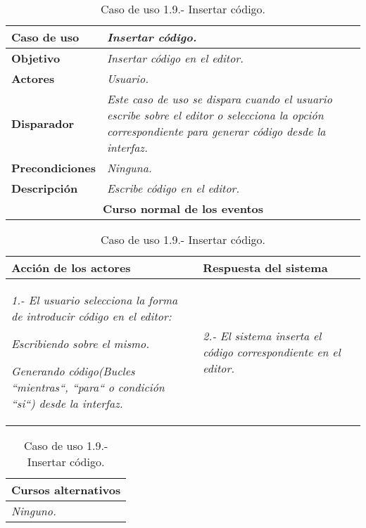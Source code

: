 \documentclass[twoside,a4paper,11pt]{book}
\begin{document}
\begin{table}[!ht]
    \centering
    \begin{tabular}{|p{4cm}|p{11.5cm}|}
    \hline

    \textbf{Caso de uso} & \textit{Insertar código.}\\
    \hline

    \textbf{Objetivo} & \textit{Insertar código en el editor.}\\
    \hline

    \textbf{Actores} & \textit{Usuario.}\\
    \hline

    \textbf{Disparador} & \textit{Este caso de uso se dispara cuando el usuario escribe sobre el editor o selecciona la opción correspondiente para
				  generar código desde la interfaz.}\\
    \hline

    \textbf{Precondiciones} & \textit{Ninguna.}\\
    \hline

    \textbf{Descripción} & \textit{Escribe código en el editor.}\\
    \hline

    \multicolumn{2}{|c|}{\textbf{Curso normal de los eventos}}\\
    \hline

    \end{tabular}
    \begin{tabular}{|p{7.75cm}|p{7.75cm}|}
    \hspace{2cm}\textbf{Acción de los actores} & \hspace{1.75cm}\textbf{Respuesta del sistema}\\
    \hline

    \textit{1.- El usuario selecciona la forma de introducir código en el editor:}

      \textit{	Escribiendo sobre el mismo.}

      \textit{	Generando código(Bucles ``mientras``, ``para`` o condición ``si``) desde la interfaz.}
    &
    \textit{2.- El sistema inserta el código correspondiente en el editor.}
    \\
    \hline
    \end{tabular}

    \begin{tabular}{|p{15.9cm}|}
      \hspace{6cm}\textbf{Cursos alternativos}\\
      \hline     
	\textit{Ninguno.}
      \\
      \hline
    \end{tabular}
    \caption{Caso de uso 1.9.- Insertar código.}
\end{table}
\end{document}
